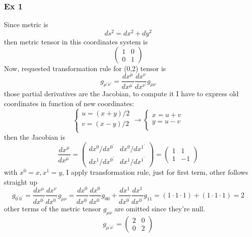 %
\subsubsection{Ex 1}
Since metric is \[
ds^{2}= dx^{2} +dy^{2}
\]
then metric tensor in this coordinates system is
\[
\begin{pmatrix}
1 & 0 \\
0 & 1
\end{pmatrix} 
\]
Now, requested transformation rule for (0,2) tensor is
\[
g_{\mu ^{\prime }\nu ^{\prime }} = \frac{d x^{\mu }}{d x^{\mu ^{\prime }}} \frac{d x^{\nu }}{d x^{\nu ^{\prime }}} g_{\mu \nu }
\]
those partial derivatives are the Jacobian, to compute it I have to express old coordinates in function of new coordinates:
\[
\begin{cases}
u = \left( x+y \right)/2 \\
v = \left( x-y \right)/2 \\
\end{cases} \to 
\begin{cases}
x = u+v \\
y = u-v \\
\end{cases}
\]
then the Jacobian is 
\[
\frac{d x^{\mu }}{d x^{\mu ^{\prime }}} = \begin{pmatrix}
dx^{0}/dx^{0^{\prime }} & dx^{0}/dx^{1^{\prime }} \\
dx^{1}/dx^{0^{\prime }} & dx^{1}/dx^{1^{\prime }}
\end{pmatrix} = \begin{pmatrix}
1 & 1 \\
1 & -1
\end{pmatrix} 
\]
with $x^{0}=x, x^{1} = y$, I apply transformation rule, just for first term, other follows straight up
\[
g_{0^{\prime }0^{\prime }} = \frac{d x^{\mu }}{d x^{0^{\prime }}}\frac{d x^{\nu }}{d x^{0^{\prime }}} g_{\mu \nu } = \frac{d x^{0}}{d x^{0^{\prime }}}\frac{d x^{0}}{d x^{0^{\prime }}} g_{00} + \frac{d x^{1}}{d x^{0^{\prime }}}\frac{d x^{1}}{d x^{0^{\prime }}} g_{11} = \left( 1\cdot1\cdot1 \right) + \left( 1\cdot1\cdot1 \right) = 2
\]
other terms of the metric tensor $g_{\mu \nu }$ are omitted since they're null. 
\[
g_{\mu ^{\prime }\nu ^{\prime }} = \begin{pmatrix}
2 & 0 \\
0 & 2
\end{pmatrix} 
\]

